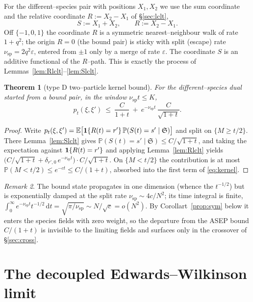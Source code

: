\documentclass[11pt]{article}
\theoremstyle{plain}
\newtheorem{theorem}{Theorem}[section]
\theoremstyle{definition}
\theoremstyle{remark}
\newtheorem{remark}[theorem]{Remark}
\newcommand{\E}{\mathbb{E}}\newcommand{\PP}{\mathbb{P}}\newcommand{\dd}{\,\mathrm{d}}
\newcommand{\eps}{\varepsilon}\newcommand{\Exp}{\mathrm{Exp}}
\begin{document}
For the different--species pair with positions $X_1,X_2$ we use the sum coordinate and
the relative coordinate $R:=X_2-X_1$ of \S\ref{sec:lclt},
\begin{equation}\label{eq:SR}
  S:=X_1+X_2,\qquad R:=X_2-X_1.
\end{equation}
Off $\{-1,0,1\}$ the coordinate $R$ is a symmetric nearest--neighbour walk of rate
$1+q^2$; the origin $R=0$ (the bound pair) is sticky with split (escape) rate
$\nu_{\mathrm{sp}}=2q^2\eps$, entered from $\pm1$ only by a merge of rate $\eps$. The
coordinate $S$ is an additive functional of the $R$--path. This is exactly the process
of Lemmas~\ref{lem:Rlclt}--\ref{lem:Slclt}.

\begin{theorem}[type D two--particle kernel bound]\label{thm:kernel}
For the different--species dual started from a bound pair, in the window
$\nu_{\mathrm{sp}}t\le K$,
\begin{equation}\label{eq:kernel}
  p_t(\xi,\xi')\ \le\ \frac{C}{1+t}\ +\ e^{-\nu_{\mathrm{sp}}t}\,\frac{C}{\sqrt{1+t}}.
\end{equation}
\end{theorem}
\begin{proof}
Write $p_t(\xi,\xi')=\E\big[\bone\{R(t)=r'\}\,\PP(S(t)=s'\mid\mathfrak S)\big]$ and
split on $\{M\ge t/2\}$. There Lemma~\ref{lem:Slclt} gives
$\PP(S(t)=s'\mid\mathfrak S)\le C/\sqrt{1+t}$, and taking the expectation against
$\mathbf 1\{R(t)=r'\}$ and applying Lemma~\ref{lem:Rlclt} yields
$\big(C/\sqrt{1+t}+\delta_{r',0}\,e^{-\nu_{\mathrm{sp}}t}\big)\cdot C/\sqrt{1+t}$. On
$\{M<t/2\}$ the contribution is at most $\PP(M<t/2)\le e^{-ct}\le C/(1+t)$, absorbed
into the first term of \eqref{eq:kernel}.
\end{proof}

\begin{remark}\label{rem:boundstate}
The bound state propagates in one dimension (whence the $t^{-1/2}$) but is
exponentially damped at the split rate $\nu_{\mathrm{sp}}\sim4c/N^2$; its time integral
is finite, $\int_0^\infty e^{-\nu_{\mathrm{sp}}t}t^{-1/2}\dd t=\sqrt{\pi/\nu_{\mathrm{sp}}}
\sim N/\sqrt c=o(N^2)$. By Corollart~\ref{prop:sym} below it enters the species fields
with zero weight, so the departure from the ASEP bound $C/(1+t)$ is invisible to the
limiting fields and surfaces only in the crossover of \S\ref{sec:cross}.
\end{remark}

\section{The decoupled Edwards--Wilkinson limit}\label{sec:ew}
\end{document}
